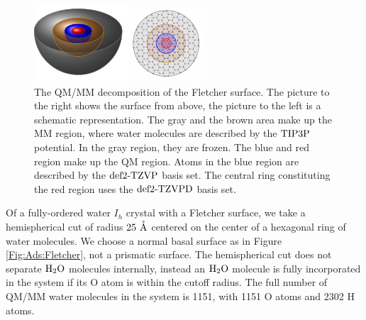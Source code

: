\documentclass[8.5pt,twoside,twocolumn]{article}
\renewcommand{\Ang}{\mathring{\te{A}}}
\theoremstyle{standard}
\begin{document}
\begin{figure}[ht]
\centering
\includegraphics[width=\textwidth]{TikzPics/TikzCreation/SurfaceQMMM/SurfaceQMMMAside.pdf}
\newline
\caption{The QM/MM decomposition of the Fletcher surface. The picture to the right shows the surface from above,
the picture to the left is a schematic representation. The gray and the brown area make up the MM region,
where water molecules are described by the $\text{TIP3P}$ potential. In the gray region, they are frozen. 
The blue and red region make up the QM region. Atoms in the blue region are described by the
$\text{def2-TZVP}$ basis set. The central ring constituting the red region uses the $\text{def2-TZVPD}$ basis set.}
\label{Fig:Ads:QMMM}
\end{figure}

Of a fully-ordered water $I_h$ crystal with a Fletcher surface, we take
a hemispherical cut of radius $25~\Ang$ centered on the center of a hexagonal
ring of water molecules. We choose a normal basal surface as in
Figure \ref{Fig:Ads:Fletcher}, not a prismatic surface. The hemispherical
cut does not separate $\text H _2 \text O$ molecules internally, instead an $\text H _2 \text O$ molecule
is fully incorporated in the system if its O atom is within the cutoff
radius. The full number of QM/MM water molecules in the system is
1151, with 1151 O atoms and 2302 H atoms.
\end{document}
